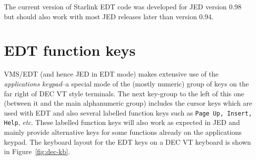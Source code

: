 \documentclass[twoside,11pt]{article}
\newcommand{\xlabel}[1]{}
\begin{document}
The current version of Starlink EDT code was developed for JED version 0.98
but should also work with most JED releases later than version 0.94.

\section{\xlabel{edt_function_keys}EDT function keys}
\label{edt_function_keys}

VMS/EDT (and hence JED in EDT mode) makes extensive use of the
\textit{applications keypad}--a special mode of the (mostly numeric)
group of keys on the far right of DEC VT style terminals. The next
key-group to the left of this one (between it and the main alphanumeric
group) includes the cursor keys which are used with EDT and also
several labelled function keys such as \texttt{Page Up, Insert, Help},
\textit{etc}.  These labelled function keys will also work as expected
in JED and mainly provide alternative keys for some functions already
on the applications keypad. The keyboard layout for the EDT keys on a
DEC VT keyboard is shown in Figure~\ref{fig:dec-kb}.
\end{document}
